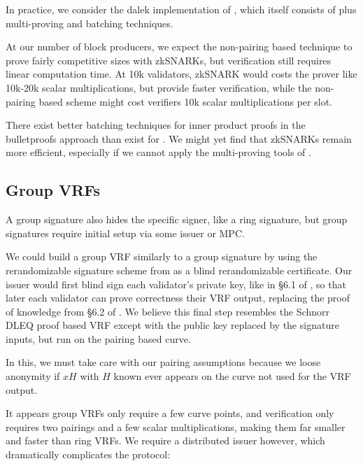 {In practice, we consider the dalek implementation \cite{dalek_bulletproofs} of \cite{bulletproofs}, which itself consists of \cite{bccgp2016} plus multi-proving and batching techniques.

At our number of block producers, we expect the non-pairing based technique to prove fairly competitive sizes with zkSNARKs, but verification still requires linear computation time.  At 10k validators, zkSNARK would costs the prover like 10k-20k scalar multiplications, but provide faster verification, while the non-pairing based scheme might cost verifiers 10k scalar multiplications per slot.  

There exist better batching techniques for inner product proofs \cite{bccgp2016} in the bulletproofs approach \cite{bulletproofs} than exist for \cite{Groth16}.  We might yet find that zkSNARKs remain more efficient, especially if we cannot apply the multi-proving tools of \cite{bulletproofs}.


\subsection{Group VRFs}
\label{sec:groupVRF}

A group signature also hides the specific signer, like a ring signature, but group signatures require initial setup via some issuer or MPC. 

We could build a group VRF similarly to a group signature by using the rerandomizable signature scheme from \cite{PS16} as a blind rerandomizable certificate.  Our issuer would first blind sign each validator's private key, like in \S6.1 of \cite{PS16}, so that later each validator can prove correctness their VRF output, replacing the proof of knowledge from \S6.2 of \cite{PS16}.  We believe this final step resembles the Schnorr DLEQ proof based VRF except with the public key replaced by the signature inputs, but run on the pairing based curve.

In this, we must take care with our pairing assumptions because we loose anonymity if $x H$ with $H$ known ever appears on the curve not used for the VRF output.  

It appears group VRFs only require a few curve points, and verification only requires two pairings and a few scalar multiplications, making them far smaller and faster than ring VRFs.  We require a distributed issuer however, which dramatically complicates the protocol:

}

